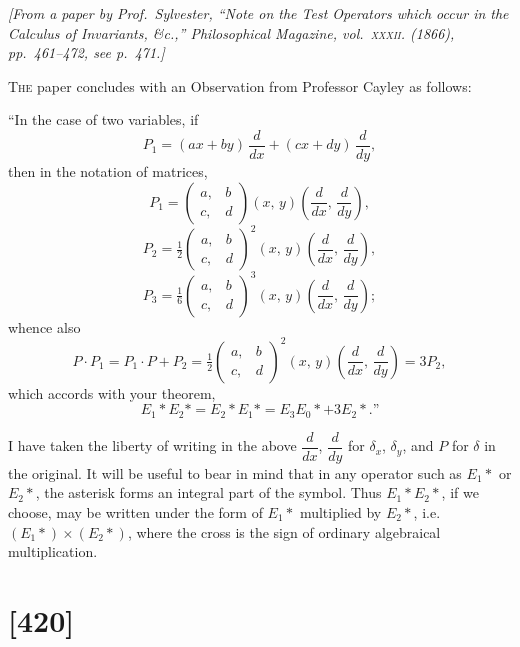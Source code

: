 \documentclass[11pt,a4paper]{article}
\begin{document}
\begin{center}
\textit{[From a paper by Prof.\ Sylvester, ``Note on the Test Operators which
occur in the Calculus of Invariants, \&c.,'' Philosophical Magazine, vol.~\textsc{xxxii}.
(1866), pp.~461--472, see p.~471.]}
\end{center}

\textsc{The} paper concludes with an Observation from Professor Cayley as
follows:

\medskip
``In the case of two variables, if
\[
P_1 = (ax + by)\,\frac{d}{dx} + (cx + dy)\,\frac{d}{dy},
\]
then in the notation of matrices,
\[
P_1 = \begin{pmatrix} a, & b \\ c, & d \end{pmatrix} (x,\,y)\!\left(\frac{d}{dx},\,\frac{d}{dy}\right),
\]
\[
P_2 = \tfrac{1}{2}\begin{pmatrix} a, & b \\ c, & d \end{pmatrix}^{\!2}(x,\,y)\!\left(\frac{d}{dx},\,\frac{d}{dy}\right),
\]
\[
P_3 = \tfrac{1}{6}\begin{pmatrix} a, & b \\ c, & d \end{pmatrix}^{\!3}(x,\,y)\!\left(\frac{d}{dx},\,\frac{d}{dy}\right);
\]
whence also
\[
P\cdot P_1 = P_1\cdot P + P_2 = \tfrac{1}{2}\begin{pmatrix} a, & b \\ c, & d \end{pmatrix}^{\!2}\!(x,\,y)\!\left(\frac{d}{dx},\,\frac{d}{dy}\right) = 3 P_2,
\]
which accords with your theorem,
\[
E_1 * E_2 * = E_2 * E_1 * = E_3 E_0 * + 3 E_2 *.\text{''}
\]

I have taken the liberty of writing in the above $\dfrac{d}{dx}$, $\dfrac{d}{dy}$
for $\delta_x$, $\delta_y$, and $P$ for $\delta$ in the original.  It will be useful
to bear in mind that in any operator such as $E_1 *$ or $E_2 *$, the asterisk
forms an integral part of the symbol.  Thus $E_1 * E_2 *$, if we choose, may be
written under the form of $E_1 *$ multiplied by $E_2 *$, i.e.\ $(E_1 *) \times (E_2 *)$,
where the cross is the sign of ordinary algebraical multiplication.

\clearpage

\section*{[420]}
\end{document}
